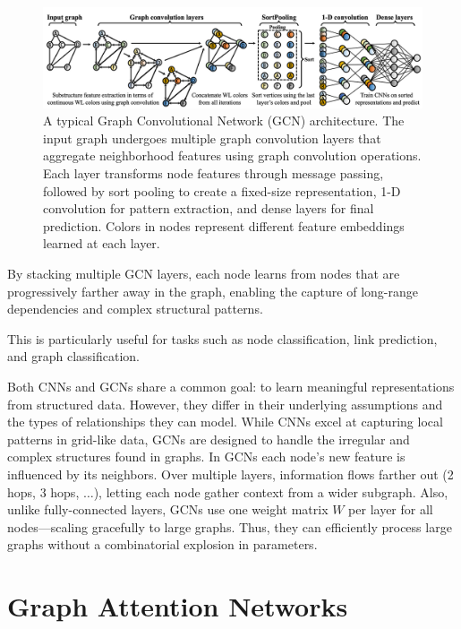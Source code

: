 \documentclass{article}
\begin{document}
\begin{figure}[ht]
      \centering
      \includegraphics[width=1.0\textwidth]{../assets/gcn_architecture.png}
      \caption{A typical Graph Convolutional Network (GCN) architecture. The input graph undergoes multiple graph convolution layers that aggregate neighborhood features using graph convolution operations. Each layer transforms node features through message passing, followed by sort pooling to create a fixed-size representation, 1-D convolution for pattern extraction, and dense layers for final prediction. Colors in nodes represent different feature embeddings learned at each layer.}
      \label{fig:gcn-architecture}
\end{figure}

By stacking multiple GCN layers, each node learns from nodes that are progressively farther away in the graph, enabling the capture of long-range dependencies and complex structural patterns.

This is particularly useful for tasks such as node classification, link prediction, and graph classification.

Both CNNs and GCNs share a common goal: to learn meaningful representations from structured data.
However, they differ in their underlying assumptions and the types of relationships they can model.
While CNNs excel at capturing local patterns in grid-like data, GCNs are designed to handle the irregular and complex structures found in graphs.
In GCNs each node's new feature is influenced by its neighbors. Over multiple layers, information flows farther out (2 hops, 3 hops, $\dots$), letting each node gather context from a wider subgraph.
Also, unlike fully-connected layers, GCNs use one weight matrix $W$ per layer for all nodes—scaling gracefully to large graphs. Thus, they can efficiently process large graphs without a combinatorial explosion in parameters.

\section{Graph Attention Networks}
\end{document}
